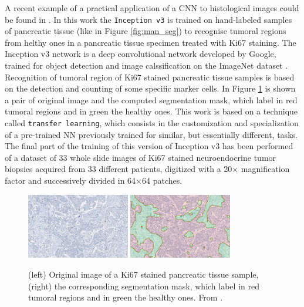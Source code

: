 A recent example of a practical application of a CNN to histological images could be found in \cite{Ki67}. In this work the \texttt{Inception v3} is trained on hand-labeled samples of pancreatic tissue (like in Figure \ref{fig:man_seg}) to recognise tumoral regions from helthy ones in a pancreatic tissue specimen treated with Ki67 staining. The Inception v3 \cite{ravindran2018classification} network is a deep convolutional network developed by Google, trained for object detection and image calssification on the ImageNet dataset \cite{5206848}. Recognition of tumoral region of Ki67 stained pancreatic tissue samples is based on the detection and counting of some specific marker cells. In Figure \ref{fig:autom_seg} is shown a pair of original image and the computed segmentation mask, which label in red tumoral regions and in green the healthy ones. This work is based on a technique called \texttt{transfer learning}, which consists in the customization and specialization of a pre-trained NN previously trained for similar, but essentially different, tasks. The final part of the training of this version of Inception v3 has been performed of a dataset of 33 whole slide images of Ki67 stained neuroendocrine tumor biopsies acquired from 33 different patients, digitized with a 20$\times$ magnification factor and successively divided in 64$\times$64 patches.

    \begin{figure}
        \centering
        \includegraphics[width = 0.4\textwidth]{images/PancTissue}
        \includegraphics[width = 0.4\textwidth]{images/PancTissueSeg}
        \caption{(left) Original image of a Ki67 stained pancreatic tissue sample, (right) the corresponding segmentation mask, which label in red tumoral regions and in green the healthy ones. From \cite{Ki67}.}
        \label{fig:autom_seg}
    \end{figure}

